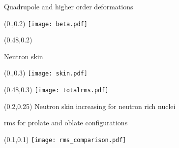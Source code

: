 \documentclass[10pt,aspectratio=169]{beamer}
\begin{document}
\begin{frame}{Quadrupole and higher order deformations}

    \centering 
    \begin{textblock*}{0.5\paperwidth}(0.\paperwidth,0.2\paperheight)
        \centering
        \texttt{[image: beta.pdf]}
    \end{textblock*}
    \begin{textblock*}{0.5\paperwidth}(0.48\paperwidth,0.2\paperheight)

    \end{textblock*}
\end{frame}


\begin{frame}{Neutron skin}

    \centering 
    \begin{textblock*}{0.5\paperwidth}(0.\paperwidth,0.3\paperheight)
        \centering
        \texttt{[image: skin.pdf]}
    \end{textblock*}
    \begin{textblock*}{0.5\paperwidth}(0.48\paperwidth,0.3\paperheight)
        \centering
        \texttt{[image: totalrms.pdf]}
    \end{textblock*}
    \begin{textblock*}{0.6\paperwidth}(0.2\paperwidth,0.25\paperheight)
            Neutron skin increasing for neutron rich nuclei
    \end{textblock*}

\end{frame}

\begin{frame}{rms for prolate and oblate configurations}

    \centering 
    \begin{textblock*}{0.8\paperwidth}(0.1\paperwidth,0.1\paperheight)
        \centering
        \texttt{[image: rms\_comparison.pdf]}
    \end{textblock*}

\end{frame}
\end{document}
